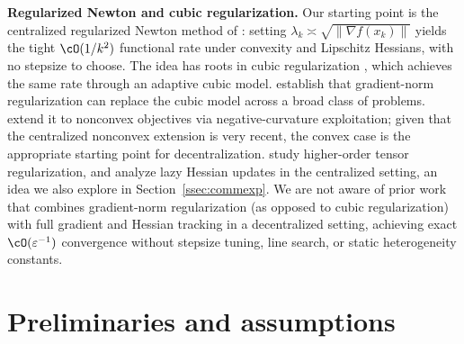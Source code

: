 \documentclass[review,onefignum,onetabnum]{siamart171218}
\begin{document}
	\noindent\textbf{Regularized Newton and cubic regularization.}
	Our starting point is the centralized regularized Newton method of
	\citet{mishchenko2023rn}: setting
	$\lambda_k\asymp\sqrt{\|\nabla f(x_k)\|}$ yields the tight
	$\cO(1/k^2)$ functional rate under convexity and Lipschitz Hessians,
	with no stepsize to choose.
	The idea has roots in cubic regularization
	\citep{nesterov2006cubic,cartis2011arc}, which achieves the same rate
	through an adaptive cubic model.
	\citet{doikov2024gradient} establish that gradient-norm
	regularization can replace the cubic model across a broad class of
	problems.
	\citet{ding2025nonconvex} extend it to nonconvex objectives via
	negative-curvature exploitation; given that the centralized
	nonconvex extension is very recent, the convex case is the
	appropriate starting point for decentralization.
	\citet{doikov2021optimization} study higher-order tensor
	regularization, and \citet{hanzely2022newton} analyze lazy Hessian
	updates in the centralized setting, an idea we also explore in
	Section~\ref{ssec:commexp}.
	We are not aware of prior work that combines gradient-norm
	regularization (as opposed to cubic regularization) with full
	gradient and Hessian tracking in a decentralized setting,
	achieving exact $\cO(\varepsilon^{-1})$ convergence without
	stepsize tuning, line search, or static heterogeneity constants.
	
	\section{Preliminaries and assumptions}\label{sec:prelim}
\end{document}
